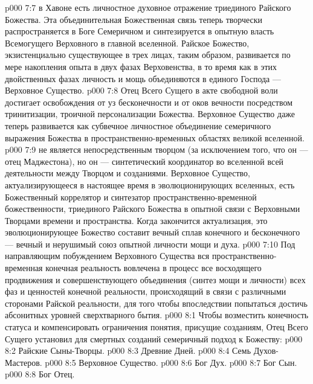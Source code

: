 \vs p000 7:7 \pc {} в Хавоне есть личностное духовное отражение триединого Райского Божества. Эта объединительная Божественная связь теперь творчески распространяется в Боге Семеричном и синтезируется в опытную власть Всемогущего Верховного в главной вселенной. Райское Божество, экзистенциально существующее в трех лицах, таким образом, развивается по мере накопления опыта в двух фазах Верховенства, в то время как в этих двойственных фазах личность и мощь объединяются в единого Господа --- Верховное Существо.
\vs p000 7:8 Отец Всего Сущего в акте свободной воли достигает освобождения от уз бесконечности и от оков вечности посредством тринитизации, троичной персонализации Божества. Верховное Существо даже теперь развивается как субвечное личностное объединение семеричного выражения Божества в пространственно\hyp{}временных областях великой вселенной.
\vs p000 7:9 \pc {} не является непосредственным творцом (за исключением того, что он --- отец Маджестона), но он --- синтетический координатор во вселенной всей деятельности между Творцом и созданиями. Верховное Существо, актуализирующееся в настоящее время в эволюционирующих вселенных, есть Божественный коррелятор и синтезатор пространственно\hyp{}временной божественности, триединого Райского Божества в опытной связи с Верховными Творцами времени и пространства. Когда закончится актуализация, это эволюционирующее Божество составит вечный сплав конечного и бесконечного --- вечный и нерушимый союз опытной личности мощи и духа.
\vs p000 7:10 Под направляющим побуждением Верховного Существа вся пространственно\hyp{}временная конечная реальность вовлечена в процесс все восходящего продвижения и совершенствующего объединения (синтез мощи и личности) всех фаз и ценностей конечной реальности, происходящий в связи с различными сторонами Райской реальности, для того чтобы впоследствии попытаться достичь абсонитных уровней сверхтварного бытия.
\vs p000 8:1 Чтобы возместить конечность статуса и компенсировать ограничения понятия, присущие созданиям, Отец Всего Сущего установил для смертных созданий семеричный подход к Божеству:
\vs p000 8:2 \bibnobreakspace Райские Сыны\hyp{}Творцы.
\vs p000 8:3 \bibnobreakspace Древние Дней.
\vs p000 8:4 \bibnobreakspace Семь Духов\hyp{}Мастеров.
\vs p000 8:5 \bibnobreakspace Верховное Существо.
\vs p000 8:6 \bibnobreakspace Бог Дух.
\vs p000 8:7 \bibnobreakspace Бог Сын.
\vs p000 8:8 \bibnobreakspace Бог Отец.
